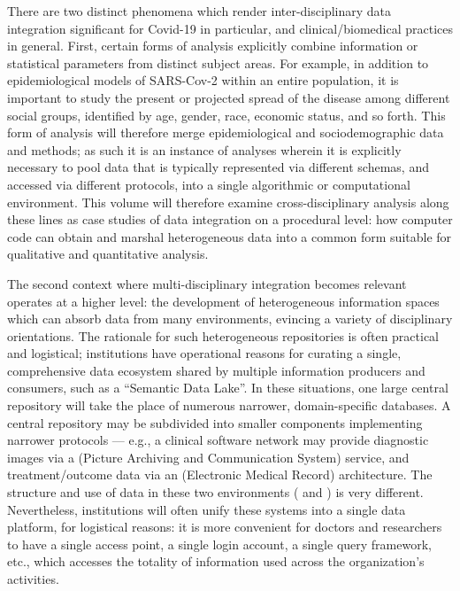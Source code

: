 \documentclass{statsoc}
\newcommand{\p}[1]{

\vspace{.75em}#1}
\newcommand{\textscc}[1]{{\color{orr!35!black}{{%
						\fontfamily{Cabin-TLF}\fontseries{b}\selectfont{\textsc{\scriptsize{#1}}}}}}}
\newcommand{\AcronymText}[1]{{\textscc{#1}}}
\newcommand{\q}[1]{{\fontfamily{qcr}\selectfont ``}#1{\fontfamily{qcr}\selectfont ''}}
\newcommand{\PACS}{\resizebox{!}{7pt}{\AcronymText{PACS}}}
\newcommand{\EMR}{\resizebox{!}{7pt}{\AcronymText{EMR}}}
\begin{document}
{%
\p{There are two distinct phenomena which render 
inter-disciplinary data integration significant for 
Covid-19 in particular, and clinical/biomedical practices 
in general.  First, certain forms of analysis explicitly 
combine information or statistical parameters from 
distinct subject areas.  For example, in addition 
to epidemiological models of SARS-Cov-2 within an 
entire population, it is important to study the 
present or projected spread of the disease among 
different social groups, identified by age, gender, 
race, economic status, and so forth.  This form 
of analysis will therefore merge epidemiological 
and sociodemographic data and methods; as such it is an 
instance of analyses wherein it is explicitly necessary 
to pool data that is typically represented 
via different schemas, and accessed via different 
protocols, into a single algorithmic or computational 
environment.  This volume will therefore 
examine cross-disciplinary analysis along these 
lines as case studies of data integration on a procedural 
level: how computer code can obtain and marshal heterogeneous 
data into a common form suitable for qualitative and quantitative analysis.} 
   
\p{The second context where multi-disciplinary integration 
becomes relevant operates at a higher level: the development 
of heterogeneous information spaces which can absorb 
data from many environments, evincing a variety of 
disciplinary orientations.  The rationale for such heterogeneous 
repositories is often practical and logistical; institutions 
have operational reasons for curating a single, comprehensive data ecosystem shared 
by multiple information producers and consumers, such as 
a \q{Semantic Data Lake}.  In these situations, one 
large central repository will take the place of numerous 
narrower, domain-specific databases.  A central repository 
may be subdivided into smaller components implementing 
narrower protocols --- e.g., a clinical software network may provide 
diagnostic images via a \PACS{} (Picture Archiving and Communication 
System) service, and treatment/outcome data via an 
\EMR{} (Electronic Medical Record) architecture.  The 
structure and use of data in these two environments 
(\PACS{} and \EMR{}) is very different.  Nevertheless, 
institutions will often unify these systems into 
a single data platform, for logistical reasons: it 
is more convenient for doctors and researchers to 
have a single access point, a single login account, 
a single query framework, etc., which accesses the 
totality of information used across the organization's 
activities.}

}
\end{document}
